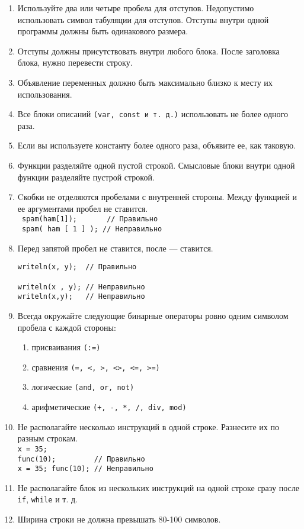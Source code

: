 \documentclass[11pt,a4paper,oneside]{article}
\begin{document}
\begin{enumerate}
    \item Используйте два или четыре пробела для отступов. 
          Недопустимо использовать символ табуляции для отступов. 
          Отступы внутри одной программы должны быть одинакового размера.
    \item Отступы должны присутствовать внутри любого блока.
          После заголовка блока, нужно перевести строку.
    \item Объявление переменных должно быть максимально близко к месту их использования.
    \item Все блоки описаний \texttt{(var, const и т. д.)} использовать не более одного раза.
    \item Если вы используете константу более одного раза, объявите ее, как таковую.
    \item Функции разделяйте одной пустой строкой. 
          Смысловые блоки внутри одной функции разделяйте пустрой строкой.
    \item Cкобки не отделяются пробелами с внутренней стороны. 
          Между функцией и ее аргументами пробел не ставится.
          \\ \texttt{ spam(ham[1]); \hbox{ } \hbox{ } \hbox{ } // Правильно}
          \\ \texttt{ spam( ham [ 1 ] ); // Неправильно}
    \item Перед запятой пробел не ставится, после --- ставится.
          \begin{verbatim}
writeln(x, y);  // Правильно
            
writeln(x , y); // Неправильно
writeln(x,y);   // Неправильно  
          \end{verbatim}
    \item Всегда окружайте следующие бинарные операторы ровно одним символом пробела с каждой стороны:
          \begin{enumerate}
            \item присваивания \texttt{(:=)}
            \item сравнения \texttt{(=, <, >, <>, <=, >=)}
            \item логические \texttt{(and, or, not)}
            \item арифметические \texttt{(+, -, *, /, div, mod)}
          \end{enumerate}              
    \item Не располагайте несколько инструкций в одной строке. Разнесите их по разным строкам.
          \\ \texttt{x = 35;} 
          \\ \texttt{func(10); \hbox{ } \hbox{ } \hbox{ } \hbox{ } // Правильно}
          \\ \texttt{x = 35; func(10); // Неправильно}
    \item Не располагайте блок из нескольких инструкций на одной строке сразу 
          после \texttt{if}, \texttt{while} и т. д.
    \item Ширина строки не должна превышать 80-100 символов.
                

\end{enumerate}
\end{document}
